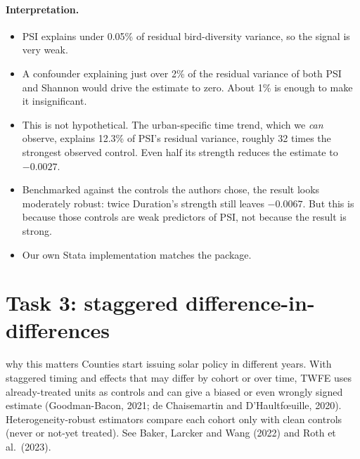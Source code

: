 \documentclass[11pt]{article}
\begin{document}
\paragraph{Interpretation.}
\begin{itemize}
\item PSI explains under 0.05\% of residual bird-diversity variance, so the signal is very weak.
\item A confounder explaining just over 2\% of the residual variance of both PSI and Shannon would drive the estimate to zero. About 1\% is enough to make it insignificant.
\item This is not hypothetical. The urban-specific time trend, which we \emph{can} observe, explains 12.3\% of PSI's residual variance, roughly 32 times the strongest observed control. Even half its strength reduces the estimate to $-0.0027$.
\item Benchmarked against the controls the authors chose, the result looks moderately robust: twice Duration's strength still leaves $-0.0067$. But this is because those controls are weak predictors of PSI, not because the result is strong.
\item Our own Stata implementation matches the  package.
\end{itemize}

\section{Task 3: staggered difference-in-differences}

\begin{conceptbox}{why this matters}
Counties start issuing solar policy in different years. With staggered timing and effects that may differ by cohort or over time, TWFE uses already-treated units as controls and can give a biased or even wrongly signed estimate (Goodman-Bacon, 2021; de Chaisemartin and D'Haultf\oe uille, 2020). Heterogeneity-robust estimators compare each cohort only with clean controls (never or not-yet treated). See Baker, Larcker and Wang (2022) and Roth et al.\ (2023).
\end{conceptbox}
\end{document}
